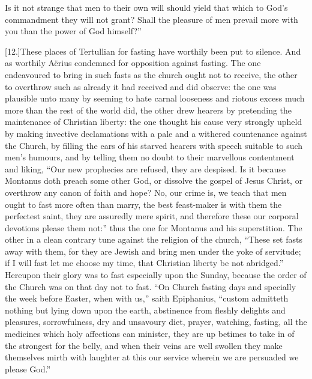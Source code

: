  Is it not strange that men to their own will should yield that which to God’s commandment they will not grant? Shall the pleasure of men prevail more with you than the power of God himself?”

[12.]These places of Tertullian for fasting have worthily been put to silence. And as worthily Aërius condemned for opposition against fasting. The one endeavoured to bring in such fasts as the church ought not to receive, the other to overthrow such as already it had received and did observe: the one was plausible unto many by seeming to hate carnal looseness and riotous excess much more than the rest of the world did, the other drew hearers by pretending the maintenance of Christian liberty: the one thought his cause very strongly upheld by making invective declamations with a pale and a withered countenance against the Church, by filling the ears of his starved hearers with speech suitable to such men’s humours, and by telling them no doubt to their marvellous contentment and liking, “Our new prophecies are refused, they are despised. Is it because Montanus doth preach some other God, or dissolve the gospel of Jesus Christ, or overthrow any canon of faith and hope? No, our crime is, we teach that men ought to fast more often than marry, the best feast-maker is with them the perfectest saint, they are assuredly mere spirit, and therefore these our corporal devotions please them not:” thus the one for Montanus and his superstition. The other in a clean contrary tune against the religion of the church, “These set fasts away with them, for they are Jewish and bring men under the yoke of servitude; if I will fast let me choose my time, that Christian liberty be not abridged.” Hereupon their glory was to fast especially upon the Sunday, because the order of  the Church was on that day not to fast.
 “On Church fasting days and specially the week before Easter, when with us,” saith Epiphanius, “custom admitteth nothing but lying down upon the earth, abstinence from fleshly delights and pleasures, sorrowfulness, dry and unsavoury diet, prayer, watching, fasting, all the medicines which holy affections can minister, they are up betimes to take in of the strongest for the belly, and when their veins are well swollen they make themselves mirth with laughter at this our service wherein we are persuaded we please God.”

